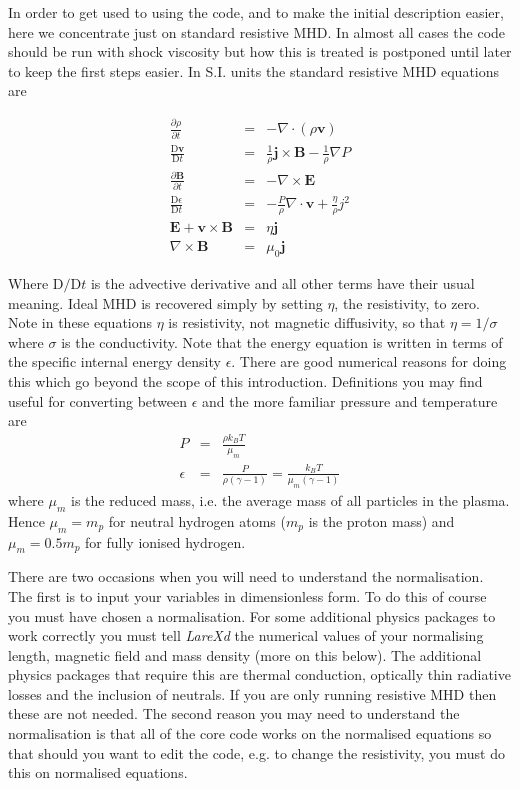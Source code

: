 \documentclass[11pt]{article}
\begin{document}
In order to get used to using the code, and to make the initial description easier, here we concentrate just on
 standard resistive MHD. In almost all cases the code should be run with 
 shock viscosity
 but how this is treated is postponed until later to keep the first steps easier. 
 In S.I. units the standard resistive MHD equations are

\begin{eqnarray}
\frac{\partial \rho}{\partial t}&=&- \nabla\cdot(\rho \mathbf{v})\\
\frac{\mathrm{D}\mathbf{v}}{\mathrm{D}t}&=&\frac{1}{\rho}\mathbf{j}\times\mathbf{B}
-\frac{1}{\rho}\nabla P\\
\frac{\partial \mathbf{B}}{\partial t}&=&-\nabla\times\mathbf{E} \label{faraday}\\
\frac{\mathrm{D}\epsilon}{\mathrm{D}t}&=&-\frac{P}{\rho}\nabla\cdot\mathbf{v}+\frac
{\eta}{\rho}j^{2}\\
\mathbf{E}+\mathbf{v}\times\mathbf{B}&=&\eta \mathbf{j} \label{ohm}\\
\nabla\times\mathbf{B}&=&\mu_0 \mathbf{j}
\end{eqnarray}

Where $\mathrm{D}/\mathrm{D}t$ is the advective derivative and all other terms have their usual meaning. Ideal MHD is recovered simply by setting $\eta$, the resistivity, to zero. Note in these equations $\eta$ is resistivity, not magnetic diffusivity, so that $\eta=1/\sigma$ where $\sigma$ is the conductivity. Note that the energy equation is written in terms of the specific internal energy density $\epsilon$. There are good numerical reasons for doing this which go beyond the scope of this introduction. Definitions you may find useful for converting between $\epsilon$ and the more familiar pressure and temperature are
\begin{eqnarray*}
P&=&\frac{\rho k_{B}T}{\mu_m}\\
\epsilon&=&\frac{P}{\rho(\gamma-1)}=\frac{k_B T}{\mu_m (\gamma-1)}
\end{eqnarray*}
where $\mu_m$ is the reduced mass, i.e. the average mass of all particles in the plasma. Hence $\mu_m=m_p$ for neutral hydrogen atoms ($m_p$ is the proton mass) and $\mu_m=0.5 m_p$ for fully ionised hydrogen.

There are two occasions when you will need to understand the normalisation. The first is to input your variables in dimensionless form. To do this of course you must have chosen a normalisation. For some additional physics packages to work correctly you must tell {\it LareXd} the numerical values of your normalising length, magnetic field and mass density (more on this below). The additional physics packages that require this are thermal conduction, optically thin radiative losses and the inclusion of neutrals. If you are only running resistive MHD then these are not needed. The second reason you may need to understand the normalisation is that all of the core code works on the normalised equations so that should you want to edit the code, e.g. to change the resistivity, you must do this on normalised equations.
\end{document}
